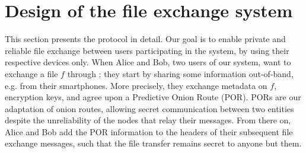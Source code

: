 \section{Design of the \name file exchange system}
\label{design}
This section presents the \name protocol in detail.
Our goal is to enable private and reliable file exchange between users participating in the system, by using their respective devices only.
When Alice and Bob, two users of our system, want to exchange a file $f$ through \name; they start by sharing some information out-of-band, e.g. from their smartphones.
More precisely, they exchange metadata on $f$, encryption keys, and agree upon a Predictive Onion Route (POR).
PORs are our adaptation of onion routes, allowing secret communication between two entities despite the unreliability of the nodes that relay their messages.
From there on, Alice and Bob add the POR information to the headers of their subsequent file exchange messages, such that the file transfer remains secret to anyone but them.



